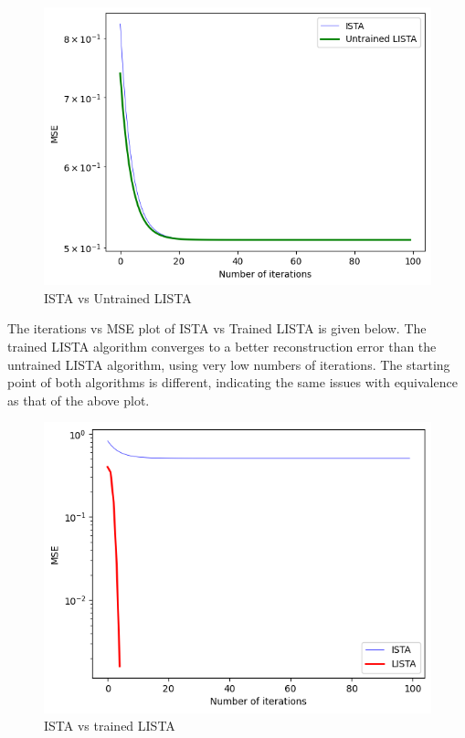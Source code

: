 \documentclass[
  letterpaper,
  DIV=11,
  numbers=noendperiod]{scrartcl}
\begin{document}
\begin{figure}[H]

{\centering \includegraphics[width=1\linewidth,height=\textheight,keepaspectratio]{abar-cs_files/mediabag/ista_vs_untrained_li.png}

}

\caption{ISTA vs Untrained LISTA}

\end{figure}%

The iterations vs MSE plot of ISTA vs Trained LISTA is given below. The
trained LISTA algorithm converges to a better reconstruction error than
the untrained LISTA algorithm, using very low numbers of iterations. The
starting point of both algorithms is different, indicating the same
issues with equivalence as that of the above plot.

\begin{figure}[H]

{\centering \includegraphics[width=1\linewidth,height=\textheight,keepaspectratio]{abar-cs_files/mediabag/ista_vs_trained_list.png}

}

\caption{ISTA vs trained LISTA}

\end{figure}%
\end{document}
